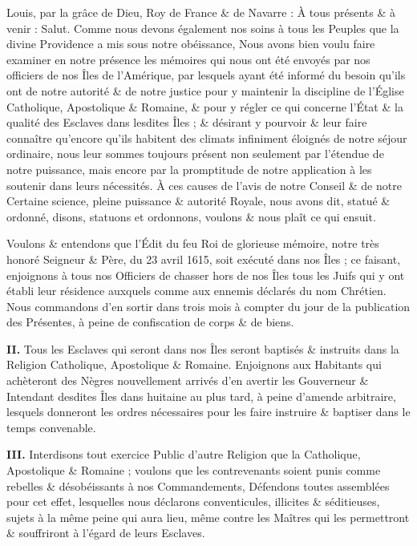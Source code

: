 \documentclass[french,twoside]{book} %
\newcommand{\labelchar}[1]{{\color{rubric}\bf #1}}
\begin{document}
\noindent Louis, par la grâce de Dieu, Roy de France \& de Navarre : À tous présents \& à venir : Salut. Comme nous devons également nos soins à tous les Peuples que la divine Providence a mis sous notre obéissance, Nous avons bien voulu faire examiner en notre présence les mémoires qui nous ont été envoyés par nos officiers de nos Îles de l’Amérique, par lesquels ayant été informé du besoin qu’ils ont de notre autorité \& de notre justice pour y maintenir la discipline de l’Église Catholique, Apostolique \& Romaine, \& pour y régler ce qui concerne l’État \& la qualité des Esclaves dans lesdites Îles ; \& désirant y pourvoir \& leur faire connaître qu’encore qu’ils habitent des climats infiniment éloignés de notre séjour ordinaire, nous leur sommes toujours présent non seulement par l’étendue de notre puissance, mais encore par la promptitude de notre application à les soutenir dans leurs nécessités. À ces causes de l’avis de notre Conseil \& de notre Certaine science, pleine puissance \& autorité Royale, nous avons dit, statué \& ordonné, disons, statuons et ordonnons, voulons \& nous plaît ce qui ensuit.\par
\bigbreak
\noindent \labelchar{{\scshape Article} I.} Voulons \& entendons que l’Édit du feu Roi de glorieuse mémoire, notre très honoré Seigneur \& Père, du 23 avril 1615, soit exécuté dans nos Îles ; ce faisant, enjoignons à tous nos Officiers de chasser hors de nos Îles tous les Juifs qui y ont établi leur résidence auxquels comme aux ennemis déclarés du nom Chrétien. Nous commandons d’en sortir dans trois mois à compter du jour de la publication des Présentes, à peine de confiscation de corps \& de biens.\par
\labelchar{II.} Tous les Esclaves qui seront dans nos Îles seront baptisés \& instruits dans la Religion Catholique, Apostolique \& Romaine. Enjoignons aux Habitants qui achèteront des Nègres nouvellement arrivés d’en avertir les Gouverneur \& Intendant desdites Îles dans huitaine au plus tard, à peine d’amende arbitraire, lesquels donneront les ordres nécessaires pour les faire instruire \& baptiser dans le temps convenable.\par
\labelchar{III.} Interdisons tout exercice Public d’autre Religion que la Catholique, Apostolique \& Romaine ; voulons que les contrevenants soient punis comme rebelles \& désobéissants à nos Commandements, Défendons toutes assemblées pour cet effet, lesquelles nous déclarons conventicules, illicites \& séditieuses, sujets à la même peine qui aura lieu, même contre les Maîtres qui les permettront \& souffriront à l’égard de leurs Esclaves.\par
\end{document}
